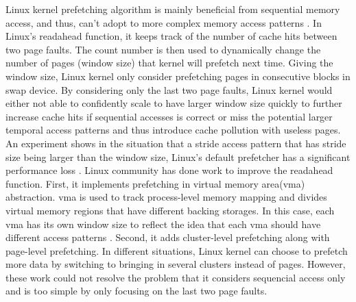 Linux kernel prefetching algorithm is mainly beneficial from sequential memory access, and thus, can't adopt to more complex memory access patterns \cite{kernel-prefetch-cache-replace}.
In Linux's readahead function, it keeps track of the number of cache hits between two page faults.
The count number is then used to dynamically change the number of pages (window size) that kernel will prefetch next time.
Giving the window size, Linux kernel only consider prefetching pages in consecutive blocks in swap device.
By considering only the last two page faults, Linux kernel would either not able to confidently scale to have larger window size quickly to further increase cache hits if sequential accesses is correct or miss the potential larger temporal access patterns and thus introduce cache pollution with useless pages.
An experiment shows in the situation that a stride access pattern that has stride size being larger than the window size, Linux's default prefetcher has a significant performance loss \cite{Leap}.
Linux community has done work to improve the readahead function.
First, it implements prefetching in virtual memory area(vma) abstraction.
vma is used to track process-level memory mapping and divides virtual memory regions that have different backing storages.
In this case, each vma has its own window size to reflect the idea that each vma should have different access patterns \cite{VMA_swap}.
Second, it adds cluster-level prefetching along with page-level prefetching.
In different situations, Linux kernel can choose to prefetch more data by switching to bringing in several clusters instead of pages.
However, these work could not resolve the problem that it considers sequencial access only and is too simple by only focusing on the last two page faults.


